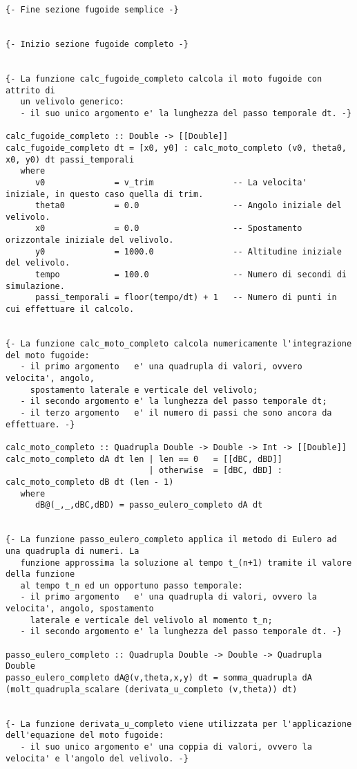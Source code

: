 \begin{verbatim}
{- Fine sezione fugoide semplice -}


{- Inizio sezione fugoide completo -}


{- La funzione calc_fugoide_completo calcola il moto fugoide con attrito di 
   un velivolo generico:
   - il suo unico argomento e' la lunghezza del passo temporale dt. -}

calc_fugoide_completo :: Double -> [[Double]]
calc_fugoide_completo dt = [x0, y0] : calc_moto_completo (v0, theta0, x0, y0) dt passi_temporali
   where
      v0              = v_trim                -- La velocita' iniziale, in questo caso quella di trim.
      theta0          = 0.0                   -- Angolo iniziale del velivolo.
      x0              = 0.0                   -- Spostamento orizzontale iniziale del velivolo.
      y0              = 1000.0                -- Altitudine iniziale del velivolo.
      tempo           = 100.0                 -- Numero di secondi di simulazione.
      passi_temporali = floor(tempo/dt) + 1   -- Numero di punti in cui effettuare il calcolo.


{- La funzione calc_moto_completo calcola numericamente l'integrazione del moto fugoide:
   - il primo argomento   e' una quadrupla di valori, ovvero velocita', angolo,
     spostamento laterale e verticale del velivolo; 
   - il secondo argomento e' la lunghezza del passo temporale dt;
   - il terzo argomento   e' il numero di passi che sono ancora da effettuare. -}

calc_moto_completo :: Quadrupla Double -> Double -> Int -> [[Double]]
calc_moto_completo dA dt len | len == 0   = [[dBC, dBD]]
                             | otherwise  = [dBC, dBD] : calc_moto_completo dB dt (len - 1)
   where
      dB@(_,_,dBC,dBD) = passo_eulero_completo dA dt


{- La funzione passo_eulero_completo applica il metodo di Eulero ad una quadrupla di numeri. La
   funzione approssima la soluzione al tempo t_(n+1) tramite il valore della funzione 
   al tempo t_n ed un opportuno passo temporale:
   - il primo argomento   e' una quadrupla di valori, ovvero la velocita', angolo, spostamento 
     laterale e verticale del velivolo al momento t_n;
   - il secondo argomento e' la lunghezza del passo temporale dt. -}

passo_eulero_completo :: Quadrupla Double -> Double -> Quadrupla Double
passo_eulero_completo dA@(v,theta,x,y) dt = somma_quadrupla dA (molt_quadrupla_scalare (derivata_u_completo (v,theta)) dt)


{- La funzione derivata_u_completo viene utilizzata per l'applicazione dell'equazione del moto fugoide:
   - il suo unico argomento e' una coppia di valori, ovvero la velocita' e l'angolo del velivolo. -}


\end{verbatim}
